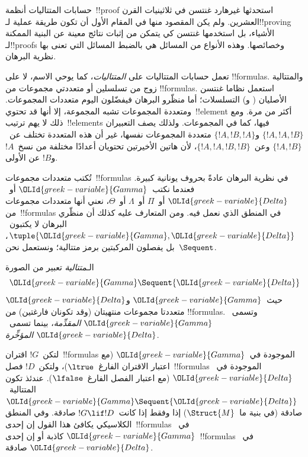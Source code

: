 \documentclass[../../../include/open-logic-section]{subfiles}
\begin{document}


حسابات المتتاليات أنظمة~!!{proof} استحدثها غيرهارد غنتسن في ثلاثينيات
القرن العشرين. ولم يكن المقصود منها في المقام الأول أن تكون طريقة عملية
لـ!!{proving} الأشياء، بل استخدمها غنتسن كي يتمكن من إثبات نتائج معينة
عن البنية الممكنة لـ!!{proof}s وخصائصها. وهذه الأنواع من المسائل هي بالضبط
المسائل التي تعنى بها نظرية البرهان.

تعمل حسابات المتتاليات على \emph{المتتاليات}، كما يوحي الاسم، لا على
!!{formula}s. والمتتالية زوج من تسلسلين أو متعددتي مجموعات من
!!{formula}s. استعمل نظاما غنتسن الأصليان ( و)
التسلسلات؛ أما منظّرو البرهان فيفضّلون اليوم متعددات المجموعات. ومتعددة
المجموعات تشبه المجموعة، إلا أنها قد تحتوي~!!{element} أكثر من مرة. ومع
ذلك لا يهم ترتيب~!!{element}s فيها، كما في المجموعات. ولذلك يصف التعبيران
$\{!A, !A, !B\}$ و$\{!A, !B, !A\}$ متعددة المجموعات نفسها، غير أن هذه
المتعددة تختلف عن~$\{!A,!B\}$ وعن~$\{!A,!A,!B,!B\}$، لأن هاتين الأخيرتين
تحتويان أعدادًا مختلفة من نسخ~$!A$ و$!B$ عن الأولى.

تُكتب متعددات مجموعات~!!{formula}s في نظرية البرهان عادةً بحروف يونانية
كبيرة. فعندما نكتب~${\OLId{greek-variable}{Gamma}}$ أو~${\OLId{greek-variable}{Delta}}$ أو~$\Pi$ أو~$\Lambda$ أو~$\Theta$،
نعني أنها متعددات مجموعات من~!!{formula}s في المنطق الذي نعمل فيه. ومن
المتعارف عليه كذلك أن منظّري البرهان لا يكتبون~$\tuple{{\OLId{greek-variable}{Gamma}},{\OLId{greek-variable}{Delta}}}$،
بل يفصلون المركبتين برمز متتالية؛ ونستعمل نحن~$\Sequent$.

\begin{defn}[متتالية]
الـ\emph{متتالية} تعبير من الصورة
\[
{\OLId{greek-variable}{Gamma}} \Sequent {\OLId{greek-variable}{Delta}}
\]
حيث~${\OLId{greek-variable}{Gamma}}$ و${\OLId{greek-variable}{Delta}}$ متعددتا مجموعات منتهيتان (وقد تكونان فارغتين) من
!!{formula}s. وتسمى~${\OLId{greek-variable}{Gamma}}$ \emph{المقدِّمة}، بينما تسمى~${\OLId{greek-variable}{Delta}}$
\emph{المؤخِّرة}.
\end{defn}

لتكن~$!G$ اقتران~!!{formula}s الموجودة في~${\OLId{greek-variable}{Gamma}}$ (مع اعتبار الاقتران
الفارغ~$\ltrue$)، ولتكن~$!D$ فصل~!!{formula}s الموجودة في~${\OLId{greek-variable}{Delta}}$ (مع
اعتبار الفصل الفارغ~$\lfalse$). عندئذ تكون المتتالية~${\OLId{greek-variable}{Gamma}}\Sequent{\OLId{greek-variable}{Delta}}$
صادقة (في بنية ما~$\Struct{M}$) إذا وفقط إذا كانت~$!G\lif !D$ صادقة. وفي
المنطق الكلاسيكي يكافئ هذا القول إن إحدى~!!{formula}s في~${\OLId{greek-variable}{Gamma}}$ كاذبة
أو إن إحدى~!!{formula}s في~${\OLId{greek-variable}{Delta}}$ صادقة.
\end{document}
